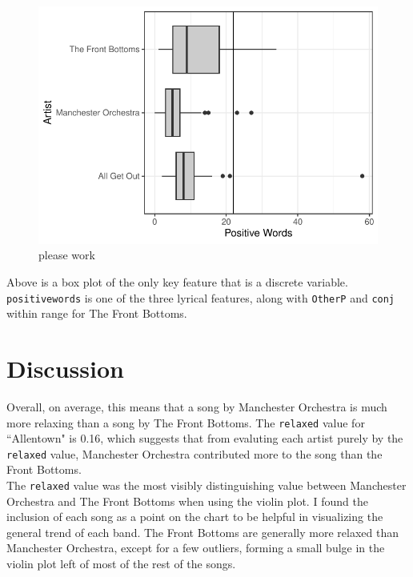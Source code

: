 \documentclass{article}\usepackage[]{graphicx}\usepackage[]{xcolor}
\makeatletter
\def\maxwidth{ %
  \ifdim\Gin@nat@width>\linewidth
    \linewidth
  \else
    \Gin@nat@width
  \fi
}
\newenvironment{knitrout}{}{} %
\makeatother
\begin{document}
\begin{multicols}{2}
 \begin{figure}[H]
\begin{knitrout}
\color{fgcolor}
\includegraphics[width=\maxwidth]{figure/unnamed-chunk-1-1} 
\end{knitrout}
 \caption{please work}
 \label{plot1} %
 \end{figure}
Above is a box plot of the only key feature that is a discrete variable. \texttt{positivewords} is one of the three lyrical features, along with \texttt{OtherP} and \texttt{conj} within range for The Front Bottoms.
\section{Discussion}
\indent Overall, on average, this means that a song by Manchester Orchestra is much more relaxing than a song by The Front Bottoms. The \texttt{relaxed} value for ``Allentown" is 0.16, which suggests that from evaluting each artist purely by the \texttt{relaxed} value, Manchester Orchestra contributed more to the song than the Front Bottoms. \\
\indent The \texttt{relaxed} value was the most visibly distinguishing value between Manchester Orchestra and The Front Bottoms when using the violin plot. I found the inclusion of each song as a point on the chart to be helpful in visualizing the general trend of each band. The Front Bottoms are generally more relaxed than Manchester Orchestra, except for a few outliers, forming a small bulge in the violin plot left of most of the rest of the songs.

\vspace{2em}

\begin{tiny}

\end{tiny}
\end{multicols}
\end{document}
